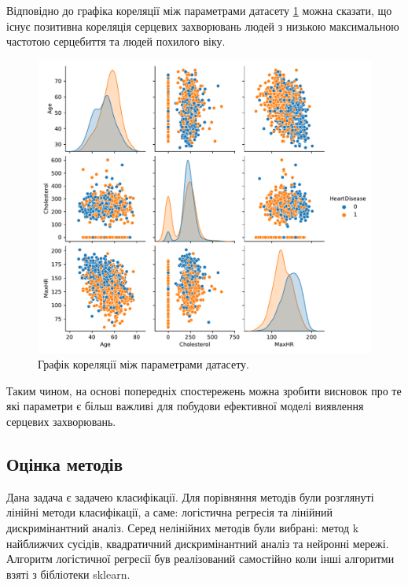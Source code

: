\documentclass[14pt,a4paper]{extarticle}
\newcounter{e}
\numberwithin{equation}{section}
\numberwithin{figure}{section}
\begin{document}
	Відповідно до графіка кореляції між параметрами датасету \ref{fig:correlation} можна сказати, що існує позитивна кореляція серцевих захворювань людей з низькою максимальною частотою серцебиття та людей похилого віку.
	
	\begin{figure}[h!]
		\centering
		\includegraphics[width=1.1 \textwidth]{images/correlation.pdf}
		\caption{Графік кореляції між параметрами датасету.}
		\label{fig:correlation}
	\end{figure}
	
	Таким чином, на основі попередніх спостережень можна зробити висновок про те які параметри є більш важливі для побудови ефективної моделі виявлення серцевих захворювань.
	
	\subsection{Оцінка методів}
    
    Дана задача є задачею класифікації. Для порівняння методів були розглянуті лінійні методи класифікації, а саме: логістична регресія та лінійний дискримінантний аналіз.  
	Серед нелінійних методів були вибрані: метод k найближчих сусідів, квадратичний дискримінантний аналіз та нейронні мережі. Алгоритм логістичної регресії був реалізований самостійно коли інші алгоритми взяті з бібліотеки sklearn. \newline \newline \newline
        
\end{document}
